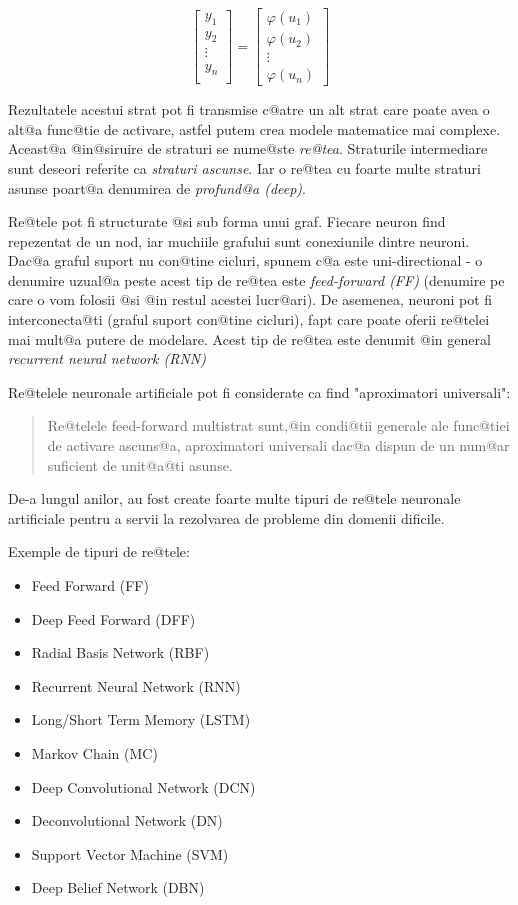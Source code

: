 $$
\begin{bmatrix}
		y_1 \\
		y_2 \\
		\vdots \\ 
		y_n \\
	\end{bmatrix}	
	=
	\begin{bmatrix}
		\varphi (u_1)\\
		\varphi	(u_2) \\
		\vdots \\
		\varphi (u_n)
	\end{bmatrix}
$$

Rezultatele acestui strat pot fi transmise c@atre un alt strat care poate avea o alt@a func@tie de activare, astfel putem crea modele matematice mai complexe. Aceast@a @in@siruire de straturi se nume@ste {\sl re@tea}. Straturile intermediare sunt deseori referite ca {\sl straturi ascunse}. Iar o re@tea cu foarte multe straturi asunse poart@a denumirea de {\sl profund@a (deep)}.

Re@tele pot fi structurate @si sub forma unui graf. Fiecare neuron find repezentat de un nod, iar muchiile grafului sunt conexiunile dintre neuroni. Dac@a graful suport nu con@tine cicluri, spunem c@a este uni-directional - o denumire uzual@a peste acest tip de re@tea este {\sl feed-forward (FF)} (denumire pe care o vom folosii @si @in restul acestei lucr@ari). De asemenea, neuroni pot fi interconecta@ti (graful suport con@tine cicluri), fapt care poate oferii re@telei mai mult@a putere de modelare. Acest tip de re@tea este denumit @in general {\sl recurrent neural network (RNN)}

Re@telele neuronale artificiale pot fi considerate ca find "aproximatori universali"\cite{hornik-nn}: 
\begin{quotation}
	Re@telele feed-forward multistrat sunt,@in condi@tii generale ale func@tiei de activare ascuns@a, aproximatori universali dac@a dispun de un num@ar suficient de unit@a@ti asunse.
\end{quotation}

De-a lungul anilor, au fost create foarte multe tipuri de re@tele neuronale artificiale pentru a servii la rezolvarea de probleme din domenii dificile.

Exemple de tipuri de re@tele:

\begin{itemize}
	\item Feed Forward (FF)
	\item Deep Feed Forward (DFF)
	\item Radial Basis Network (RBF)
	\item Recurrent Neural Network (RNN)
	\item Long/Short Term Memory (LSTM)
	\item Markov Chain (MC)
	\item Deep Convolutional Network (DCN)
	\item Deconvolutional Network (DN)
	\item Support Vector Machine (SVM)
	\item Deep Belief Network (DBN)
\end{itemize}


